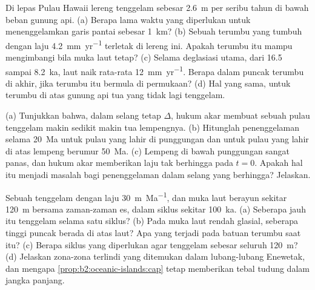 \begin{exercise}[$\star\star$]\label{exo:b2:oceanic-islands:9}
Di lepas Pulau Hawaii lereng tenggelam sebesar \qty{2.6}{m} per seribu tahun di bawah beban
gunung api. (a) Berapa lama waktu yang diperlukan untuk menenggelamkan garis pantai sebesar \qty{1}{km}? (b) Sebuah terumbu yang tumbuh dengan laju
\qty{4.2}{mm.yr^{-1}} terletak di lereng ini. Apakah terumbu itu mampu mengimbangi bila muka laut tetap? (c) Selama
deglasiasi utama, dari 16.5 sampai \qty{8.2}{ka}, laut naik rata-rata \qty{12}{mm.yr^{-1}}. Berapa
dalam puncak terumbu di akhir, jika terumbu itu bermula di permukaan? (d) Hal yang sama, untuk terumbu di atas
gunung api tua yang tidak lagi tenggelam.
\end{exercise}

\begin{exercise}[$\star\star\star$]\label{exo:b2:oceanic-islands:10}
(a) Tunjukkan bahwa, dalam selang tetap $\Delta$, hukum akar membuat sebuah pulau tenggelam makin sedikit makin tua
lempengnya. (b) Hitunglah penenggelaman selama \qty{20}{Ma} untuk pulau yang lahir di punggungan dan untuk pulau yang lahir
di atas lempeng berumur \qty{50}{Ma}. (c) Lempeng di bawah punggungan sangat panas, dan hukum akar memberikan laju
tak berhingga pada $t = 0$. Apakah hal itu menjadi masalah bagi penenggelaman dalam selang yang berhingga? Jelaskan.
\end{exercise}

\begin{exercise}[$\star\star\star$]\label{exo:b2:oceanic-islands:11}
Sebuah  tenggelam dengan laju \qty{30}{m.Ma^{-1}}, dan muka laut berayun sekitar \qty{120}{m} bersama zaman-zaman
es, dalam siklus sekitar \qty{100}{ka}. (a) Seberapa jauh  itu tenggelam selama satu siklus? (b) Pada
muka laut rendah glasial, seberapa tinggi puncak  berada di atas laut? Apa yang terjadi pada
batuan terumbu saat itu? (c) Berapa siklus yang diperlukan agar  tenggelam sebesar seluruh \qty{120}{m}?
(d) Jelaskan zona-zona terlindi yang ditemukan dalam lubang-lubang Enewetak, dan mengapa
\cref{prop:b2:oceanic-islands:cap} tetap memberikan tebal tudung dalam jangka panjang.
\end{exercise}

